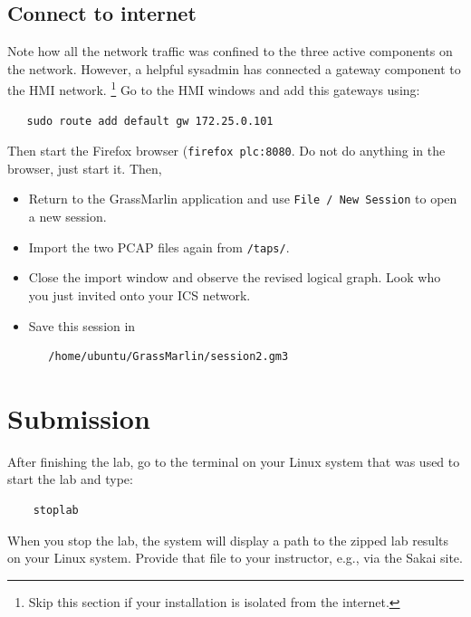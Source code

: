 \subsection{Connect to internet}
Note how all the network traffic was confined to the three active components on the network.  However, a helpful sysadmin has connected
a gateway component to the HMI network.  \footnote{Skip this section if your installation is isolated from the internet.}  
Go to the HMI windows and add this gateways using:
\begin{verbatim}
   sudo route add default gw 172.25.0.101
\end{verbatim}
\noindent Then start the Firefox browser ({\tt firefox plc:8080}.  Do not do anything in the browser, just start it. Then,
\begin{itemize}
\item Return to the GrassMarlin application and use {\tt File / New Session} to open a new session.  
\item Import the two PCAP files again from {\tt /taps/}.  
\item Close the import window and observe the revised logical graph.  Look who you just invited onto your ICS network.
\item Save this session in 
\begin{verbatim}
   /home/ubuntu/GrassMarlin/session2.gm3
\end{verbatim}
\end{itemize}


\section{Submission}
After finishing the lab, go to the terminal on your Linux system that was used to start the lab and type:
\begin{verbatim}
    stoplab 
\end{verbatim}
When you stop the lab, the system will display a path to the zipped lab results on your Linux system.  Provide that file to 
your instructor, e.g., via the Sakai site.

\copyrightnotice


